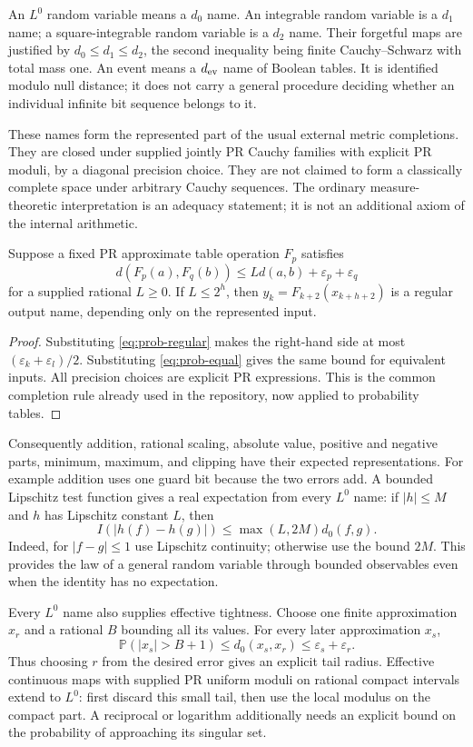 An $L^0$ random variable means a $d_0$ name. An integrable random variable is
a $d_1$ name; a square-integrable random variable is a $d_2$ name. Their
forgetful maps are justified by $d_0\le d_1\le d_2$, the second inequality
being finite Cauchy--Schwarz with total mass one. An event means a
$d_{\rm ev}$ name of Boolean tables. It is identified modulo null distance;
it does not carry a general procedure deciding whether an individual infinite
bit sequence belongs to it.

These names form the represented part of the usual external metric
completions. They are closed under supplied jointly PR Cauchy families with
explicit PR moduli, by a diagonal precision choice. They are not claimed to
form a classically complete space under arbitrary Cauchy sequences. The
ordinary measure-theoretic interpretation is an adequacy statement; it is
not an additional axiom of the internal arithmetic.

\begin{proposition}
Suppose a fixed PR approximate table operation $F_p$ satisfies
\[
 d(F_p(a),F_q(b))\le Ld(a,b)+\varepsilon_p+\varepsilon_q
\]
for a supplied rational $L\ge0$. If $L\le2^h$, then
$y_k=F_{k+2}(x_{k+h+2})$ is a regular output name, depending only on the
represented input.
\end{proposition}
\begin{proof}
Substituting \eqref{eq:prob-regular} makes the right-hand side at most
$(\varepsilon_k+\varepsilon_l)/2$. Substituting
\eqref{eq:prob-equal} gives the same bound for equivalent inputs. All
precision choices are explicit PR expressions. This is the common completion
rule already used in the repository, now applied to probability tables.
\end{proof}

Consequently addition, rational scaling, absolute value, positive and negative
parts, minimum, maximum, and clipping have their expected representations.
For example addition uses one guard bit because the two errors add. A
bounded Lipschitz test function gives a real expectation from every $L^0$
name: if $|h|\le M$ and $h$ has Lipschitz constant $L$, then
\[
 I(|h(f)-h(g)|)\le \max(L,2M)d_0(f,g).
\]
Indeed, for $|f-g|\le1$ use Lipschitz continuity; otherwise use the bound
$2M$. This provides the law of a general random variable through bounded
observables even when the identity has no expectation.

Every $L^0$ name also supplies effective tightness. Choose one finite
approximation $x_r$ and a rational $B$ bounding all its values. For every
later approximation $x_s$,
\[
 \mathbb P(|x_s|>B+1)\le d_0(x_s,x_r)
                         \le\varepsilon_s+\varepsilon_r.
\]
Thus choosing $r$ from the desired error gives an explicit tail radius.
Effective continuous maps with supplied PR uniform moduli on rational compact
intervals extend to $L^0$: first discard this small tail, then use the local
modulus on the compact part. A reciprocal or logarithm additionally needs
an explicit bound on the probability of approaching its singular set.

